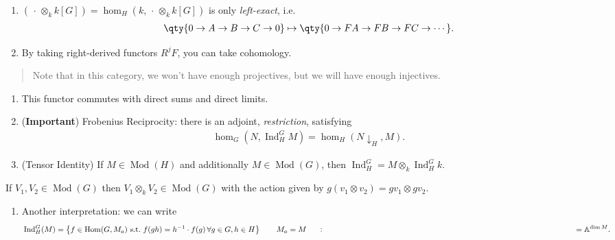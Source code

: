 \begin{enumerate}
\def\labelenumi{\arabic{enumi}.}
\item
  \(({\,\cdot\,}\otimes_k k[G]) = \hom_H(k, {\,\cdot\,}\otimes_k k[G])\)
  is only \emph{left-exact},
  i.e.~\begin{align*}       \qty{0\to A\to B\to C\to 0}\mapsto \qty{0\to FA \to FB \to FC \to \cdots}     .\end{align*}
\item
  By taking right-derived functors \(R^jF\), you can take cohomology.
\end{enumerate}

\begin{quote}
Note that in this category, we won't have enough projectives, but we
will have enough injectives.
\end{quote}

\begin{enumerate}
\def\labelenumi{\arabic{enumi}.}
\setcounter{enumi}{2}
\item
  This functor commutes with direct sums and direct limits.
\item
  (\textbf{Important}) Frobenius Reciprocity: there is an adjoint,
  \emph{restriction}, satisfying
  \begin{align*}       \hom_G(N, \operatorname{Ind}_H^G M) = \hom_H(N\downarrow_H, M)     .\end{align*}
\item
  (Tensor Identity) If \(M\in {\operatorname{Mod}}(H)\) and additionally
  \(M \in {\operatorname{Mod}}(G)\), then
  \(\operatorname{Ind}_H^G = M \otimes_k \operatorname{Ind}_H^G k\).
\end{enumerate}

If \(V_1, V_2 \in {\operatorname{Mod}}(G)\) then
\(V_1 \otimes_k V_2 \in {\operatorname{Mod}}(G)\) with the action given
by \(g(v_1\otimes v_2) = gv_1 \otimes gv_2\).

\begin{enumerate}
\def\labelenumi{\arabic{enumi}.}
\setcounter{enumi}{5}
\tightlist
\item
  Another interpretation: we can write
  \begin{align*}       \operatorname{Ind}_H^G(M) = \left\{{f\in {\operatorname{Hom}}(G, M_a)     ~{\text{s.t.}}~     f(gh) = h^{-1} \cdot f(g)     \, \forall g\in G, h\in H}\right\} \qquad M_a = M \mathrel{\vcenter{:}}={\mathbb{A}}^{\dim M}     .\end{align*}
\end{enumerate}

